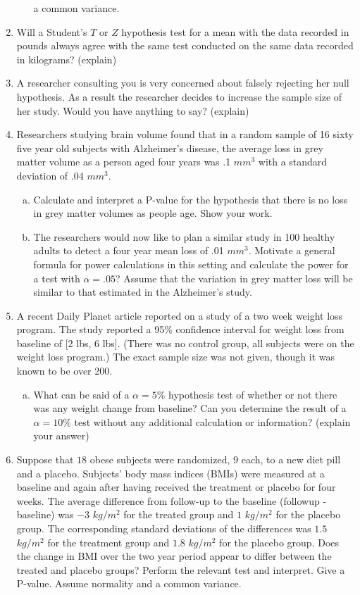 \documentclass[12pt]{article}
\begin{document}
\begin{enumerate}[Problem 1.]
\begin{enumerate}[a.]
  a common variance.
\end{enumerate}
\item Will a Student's $T$ or $Z$ hypothesis test for a mean with
  the data recorded in pounds always agree with the same test
  conducted on the same data recorded in kilograms? (explain)
\item A researcher consulting you is very concerned about falsely
  rejecting her null hypothesis. As a result the researcher decides to
  increase the sample size of her study. Would you have anything to
  say?  (explain)
\item Researchers studying brain volume found that in a random sample
  of 16 sixty five year old subjects with Alzheimer's disease, the average
  loss in grey matter volume as a person aged four years was .1 $mm^3$
  with a standard deviation of .04 $mm^3$.
\begin{enumerate}[a.]
\item Calculate and interpret a P-value for the
  hypothesis that there is no loss in grey matter volumes as
  people age. Show your work.
\item The researchers would now like to plan a similar
    study in 100 healthy adults to detect a four year mean loss of .01
    $mm^3$. Motivate a general formula for power calculations in this
    setting and calculate the power for a test with $\alpha = .05$?
    Assume that the variation in grey matter loss will be similar to
    that estimated in the Alzheimer's study.
\end{enumerate}
\item A recent Daily Planet article reported on a study of a two week
  weight loss program.  The study reported a 95\% confidence interval
  for weight loss from baseline of [2 lbs, 6 lbs]. (There was no
  control group, all subjects were on the weight loss program.)  The
  exact sample size was not given, though it was known to be over 200.
  \begin{enumerate}[a.]
  \item  What can be said of a $\alpha = 5\%$ hypothesis
    test of whether or not there was any weight change from baseline?
    Can you determine the result of a $\alpha = 10\%$ test without any
    additional calculation or information? (explain your answer)
  \end{enumerate}
\item Suppose that $18$ obese subjects were randomized, $9$ each, to a
  new diet pill and a placebo. Subjects' body mass indices (BMIs) were
  measured at a baseline and again after having received the treatment
  or placebo for four weeks.  The average difference from follow-up to
  the baseline (followup - baseline) was $-3$ $kg/m^2$ for the treated
  group and $1$ $kg/m^2$ for the placebo group.  The corresponding
  standard deviations of the differences was $1.5$ $kg / m^2$ for the
  treatment group and $1.8$ $kg / m^2$ for the placebo group.
  Does the change in BMI over the two year period appear to differ
  between the treated and placebo groups? Perform the relevant
  test and interpret. Give a P-value.  Assume normality and a
  common variance.
\end{enumerate}
\end{document}

